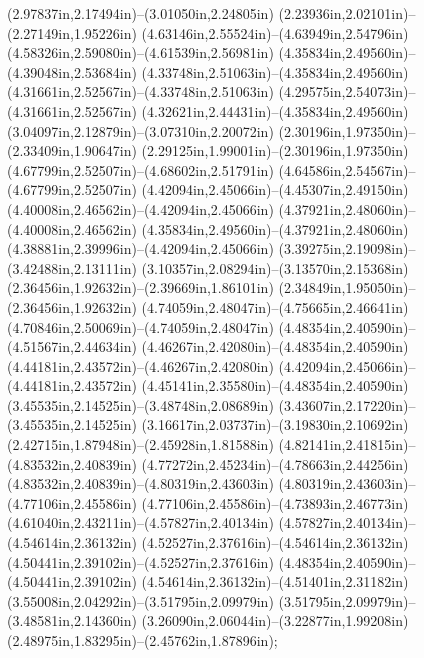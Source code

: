 (2.97837in,2.17494in)--(3.01050in,2.24805in) (2.23936in,2.02101in)--(2.27149in,1.95226in) (4.63146in,2.55524in)--(4.63949in,2.54796in) (4.58326in,2.59080in)--(4.61539in,2.56981in) (4.35834in,2.49560in)--(4.39048in,2.53684in) (4.33748in,2.51063in)--(4.35834in,2.49560in) (4.31661in,2.52567in)--(4.33748in,2.51063in) (4.29575in,2.54073in)--(4.31661in,2.52567in) (4.32621in,2.44431in)--(4.35834in,2.49560in) (3.04097in,2.12879in)--(3.07310in,2.20072in) (2.30196in,1.97350in)--(2.33409in,1.90647in) (2.29125in,1.99001in)--(2.30196in,1.97350in) (4.67799in,2.52507in)--(4.68602in,2.51791in) (4.64586in,2.54567in)--(4.67799in,2.52507in) (4.42094in,2.45066in)--(4.45307in,2.49150in) (4.40008in,2.46562in)--(4.42094in,2.45066in) (4.37921in,2.48060in)--(4.40008in,2.46562in) (4.35834in,2.49560in)--(4.37921in,2.48060in) (4.38881in,2.39996in)--(4.42094in,2.45066in) (3.39275in,2.19098in)--(3.42488in,2.13111in) (3.10357in,2.08294in)--(3.13570in,2.15368in) (2.36456in,1.92632in)--(2.39669in,1.86101in) (2.34849in,1.95050in)--(2.36456in,1.92632in) (4.74059in,2.48047in)--(4.75665in,2.46641in) (4.70846in,2.50069in)--(4.74059in,2.48047in) (4.48354in,2.40590in)--(4.51567in,2.44634in) (4.46267in,2.42080in)--(4.48354in,2.40590in) (4.44181in,2.43572in)--(4.46267in,2.42080in) (4.42094in,2.45066in)--(4.44181in,2.43572in) (4.45141in,2.35580in)--(4.48354in,2.40590in) (3.45535in,2.14525in)--(3.48748in,2.08689in) (3.43607in,2.17220in)--(3.45535in,2.14525in) (3.16617in,2.03737in)--(3.19830in,2.10692in) (2.42715in,1.87948in)--(2.45928in,1.81588in) (4.82141in,2.41815in)--(4.83532in,2.40839in) (4.77272in,2.45234in)--(4.78663in,2.44256in) (4.83532in,2.40839in)--(4.80319in,2.43603in) (4.80319in,2.43603in)--(4.77106in,2.45586in) (4.77106in,2.45586in)--(4.73893in,2.46773in) (4.61040in,2.43211in)--(4.57827in,2.40134in) (4.57827in,2.40134in)--(4.54614in,2.36132in) (4.52527in,2.37616in)--(4.54614in,2.36132in) (4.50441in,2.39102in)--(4.52527in,2.37616in) (4.48354in,2.40590in)--(4.50441in,2.39102in) (4.54614in,2.36132in)--(4.51401in,2.31182in) (3.55008in,2.04292in)--(3.51795in,2.09979in) (3.51795in,2.09979in)--(3.48581in,2.14360in) (3.26090in,2.06044in)--(3.22877in,1.99208in) (2.48975in,1.83295in)--(2.45762in,1.87896in);
